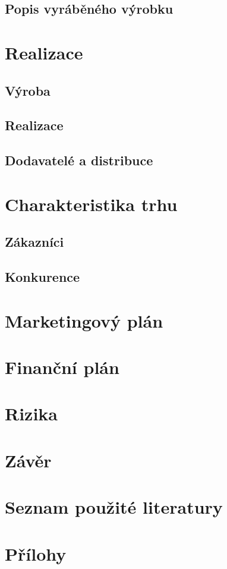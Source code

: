 \documentclass[12pt, a4paper]{article}
\begin{document}
\subsection{Popis vyráběného výrobku}



\section{Realizace}
\subsection{Výroba}
\subsection{Realizace}
\subsection{Dodavatelé a distribuce}
\section{Charakteristika trhu}
\subsection{Zákazníci}
\subsection{Konkurence}
\section{Marketingový plán}
\section{Finanční plán}
\section{Rizika}
\section{Závěr}
\section{Seznam použité literatury}
\printbibliography[heading=none]
\section{Přílohy}
\end{document}
